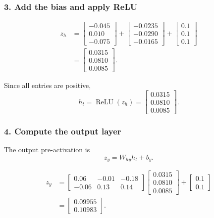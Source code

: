 \documentclass[11pt]{article}
\begin{document}
\subsubsection*{3. Add the bias and apply ReLU}

\[
\begin{aligned}
    z_h
    &=
    \begin{bmatrix}
        -0.045 \\
        0.010 \\
        -0.075
    \end{bmatrix}
    +
    \begin{bmatrix}
        -0.0235 \\
        -0.0290 \\
        -0.0165
    \end{bmatrix}
    +
    \begin{bmatrix}
        0.1 \\
        0.1 \\
        0.1
    \end{bmatrix} \\
    &=
    \begin{bmatrix}
        0.0315 \\
        0.0810 \\
        0.0085
    \end{bmatrix}.
\end{aligned}
\]

Since all entries are positive,
\[
    h_t = \operatorname{ReLU}(z_h)
    =
    \begin{bmatrix}
        0.0315 \\
        0.0810 \\
        0.0085
    \end{bmatrix}.
\]

\subsubsection*{4. Compute the output layer}

The output pre-activation is
\[
    z_y = W_{hy}h_t + b_y.
\]

\[
\begin{aligned}
    z_y
    &=
    \begin{bmatrix}
        0.06 & -0.01 & -0.18 \\
        -0.06 & 0.13 & 0.14
    \end{bmatrix}
    \begin{bmatrix}
        0.0315 \\
        0.0810 \\
        0.0085
    \end{bmatrix}
    +
    \begin{bmatrix}
        0.1 \\
        0.1
    \end{bmatrix} \\
    &=
    \begin{bmatrix}
        0.09955 \\
        0.10983
    \end{bmatrix}.
\end{aligned}
\]
\end{document}
